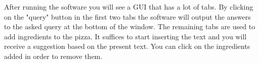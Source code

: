\documentclass[10pt,a4paper]{article}
\begin{document}
After running the software you will see a GUI that has a lot of tabs. By clicking on the "query" button in the first two tabs the software will output the answers to the asked query at the bottom of the window. The remaining tabs are used to add ingredients to the pizza. It suffices to start inserting the text and you will receive a suggestion based on the present text. You can click on the ingredients added in order to remove them.
\end{document}
